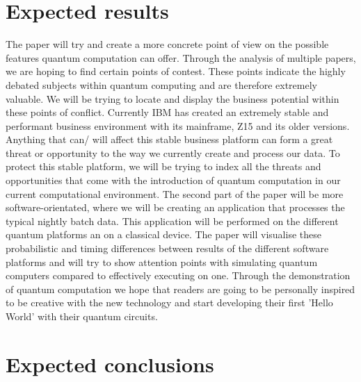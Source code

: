 \section{Expected results}
\label{sec:Expected results}

 The paper will try and create a more concrete point of view on the possible features quantum computation can offer.
 Through the analysis of multiple papers, we are hoping to find certain points of contest. These points indicate the highly debated subjects within quantum computing and are therefore extremely valuable. We will be trying to locate and display the business potential within these points of conflict. Currently IBM has created an extremely stable and performant business environment with its mainframe, Z15 and its older versions. Anything that can/ will affect this stable business platform can form a great threat or opportunity to the way we currently create and process our data. To protect this stable platform, we will be trying to index all the threats and opportunities that come with the introduction of quantum computation in our current computational environment. The second part of the paper will be more software-orientated, where we will be creating an application that processes the typical nightly batch data. This application will be performed on the different quantum platforms an on a classical device. The paper will visualise these probabilistic and timing differences between results of the different software platforms and will try to show attention points with simulating quantum computers compared to effectively executing on one. Through the demonstration of quantum computation we hope that readers are going to be personally inspired to be creative with the new technology and start developing their first 'Hello World' with their quantum circuits.

\section{Expected conclusions}
\label{sec:Expected conclusions}

